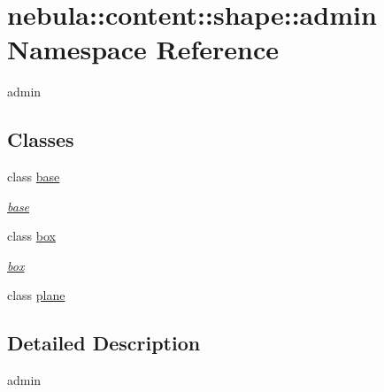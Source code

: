 \hypertarget{namespacenebula_1_1content_1_1shape_1_1admin}{
\section{nebula::content::shape::admin Namespace Reference}
\label{namespacenebula_1_1content_1_1shape_1_1admin}
}


admin  
\subsection*{Classes}
\begin{DoxyCompactItemize}
\item 
class \hyperlink{classnebula_1_1content_1_1shape_1_1admin_1_1base}{base}
\begin{DoxyCompactList}\small\item\em \hyperlink{classnebula_1_1content_1_1shape_1_1admin_1_1base}{base} \item\end{DoxyCompactList}\item 
class \hyperlink{classnebula_1_1content_1_1shape_1_1admin_1_1box}{box}
\begin{DoxyCompactList}\small\item\em \hyperlink{classnebula_1_1content_1_1shape_1_1admin_1_1box}{box} \item\end{DoxyCompactList}\item 
class \hyperlink{classnebula_1_1content_1_1shape_1_1admin_1_1plane}{plane}
\end{DoxyCompactItemize}


\subsection{Detailed Description}
admin 